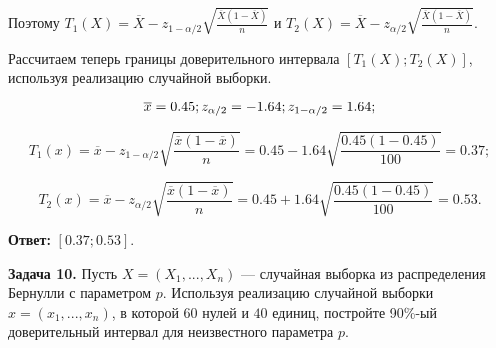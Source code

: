 Поэтому $T_{1} \left(X\right)=\overline{X}-z_{1-\alpha /2} \sqrt{\frac{\overline{X}\left(1-\overline{X}\right)}{n} } $ и $T_{2} \left(X\right)=\overline{X}-z_{\alpha /2} \sqrt{\frac{\overline{X}\left(1-\overline{X}\right)}{n} } $.

Рассчитаем теперь границы доверительного интервала $\left[T_{1} \left(X\right);T_{2} \left(X\right)\right]$, используя реализацию случайной выборки.

\[\overline{x}=0.45; z_{\alpha /2} =-{\rm 1.64}; z_{1-\alpha /2} ={\rm 1.64};\] 

\[T_{1} \left(x\right)=\overline{x}-z_{1-\alpha /2} \sqrt{\frac{\overline{x}\left(1-\overline{x}\right)}{n} } =0.45-1.64\sqrt{\frac{0.45\left(1-0.45\right)}{100} } =0.37;\] 

\[T_{2} \left(x\right)=\overline{x}-z_{\alpha /2} \sqrt{\frac{\overline{x}\left(1-\overline{x}\right)}{n} } =0.45+1.64\sqrt{\frac{0.45\left(1-0.45\right)}{100} } =0.53.\] 

\textbf{Ответ:} $\left[0.37;0.53\right]$.



\textbf{Задача 10.}  Пусть $X=\left(X_{1} ,...,X_{n} \right)$ --- случайная выборка из распределения Бернулли с параметром $p$. Используя реализацию случайной выборки $x=\left(x_{1} ,...,x_{n} \right)$, в которой $60$ нулей и $40$ единиц, постройте 90\%-ый доверительный интервал для неизвестного параметра $p$.







